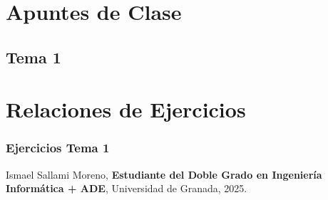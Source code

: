 \documentclass[a4paper,12pt]{book}
\begin{document}
\part{Apuntes de Clase}

\chapter{Tema 1}



\part{Relaciones de Ejercicios}
\section{Ejercicios Tema 1}
% 




\newpage
\begin{thebibliography}{99}
Ismael Sallami Moreno, \textbf{Estudiante del Doble Grado en Ingeniería Informática + ADE}, Universidad de Granada, 2025.

\end{thebibliography}
\end{document}
